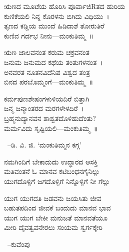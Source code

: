 \bgroup\noindent\leftskip=1cm ಋಣದ ಮೂಟೆಯ ಹೊರಿಸಿ ಪೂರ್ವಾಜಿRತದ ಹುರಿಯ\\ ಕುಣಿಕೆಯಲಿ ನಿನ್ನ ಕೊರಳನು ಬಿಗಿದು ವಿಧಿಯು~।\\ ತೃಣದ ಕಡ್ಡಿಯ ಮುಂದೆ ಹಿಡಿದಾಶೆ ತೋರುತಿರೆ\\ ಕುಣಿವ ಗರ್ದಭ ನೀನು—ಮಂಕುತಿಮ್ಮ~॥\par\egroup

\smallskip

\bgroup\noindent\leftskip=1cm ಋಣ ಜಾಲವನಂತ ಕರುಮ ಚಕ್ರವನಂತ\\ ಜನುಮ ಜನುಮದ ಕಥೆಯ ತಂತುಗಳನಂತ~।\\ ಅನವರತ ನೂತನವಿದೆನಿಪ ವಿಶ್ವದ ತಂತ್ರ\\ ಬಿನದ ಪರಬೊಮ್ಮಂಗೆ—ಮಂಕುತಿಮ್ಮ~॥\par\egroup

\smallskip

\bgroup\noindent\leftskip=1cm ಕರ್ಮಪುಣಶೇಷಂಗಳುಳಿಯದಿರೆ ಬಿತ್ತಾಗಿ\\ ಜನ್ಮ ಜನ್ಮಾಂತರದ ಮರಗಳೇಳದಿರೆ~।\\ ಬ್ರಹ್ಮನುದ್ಯಾನವನ ಶಾಶ್ವತದೊಳಿಹುದೆಂತು?\\ ಮರ್ಮವಿದು ಸೃಷ್ಟಿಯಲಿ—ಮಂಕುತಿಮ್ಮ~॥\par\egroup

~\hfill–ಡಿ. ವಿ. ಜಿ. ‘ಮಂಕುತಿಮ್ಮನ ಕಗ್ಗ’

\smallskip

\bgroup\noindent\leftskip=1cm ನಮಗಿಂದಿಗೆ ಬೇಕಾದುದು ಉದ್ಧಾರದ ಆಸಕ್ತಿ \\ ಮತಿವಂತನೆ ಓ ಮಾನವ ಕಟಿಬಂಧನಗೈನಿಲ್ಲು\\ ಯುಗದೊಳ್ಪಿಗೆ ಜಗದೊಳ್ಪಿಗೆ ನಿನ್ನೊಳ್ಪಿಗೆ ನೀ ಗೆಲ್ಲು\par\egroup

\smallskip

\bgroup\noindent\leftskip=1cm ಯುಗ ಯುಗದತಿ ಜಡವನು ಜಯಸಿತು ಜೀವ\\ ಬಹುತಪದಿಂದ ಜೀವಕೆ ಬಂದುದು ಮಾನವ ಭಾವ\\ ಯುಗ ಯುಗ ಬೇಕೀ ಮನುಜತೆ ಮಾನವತೆಯೂ\\ ಮೀರಿ ದೈವತ್ವವನೇರಲು ಸಂಯಮ ಸ್ವರ್ಗಕ್ಕೇರಿ\par\egroup 

~\hfill–ಕುವೆಂಪು

\chapterend


